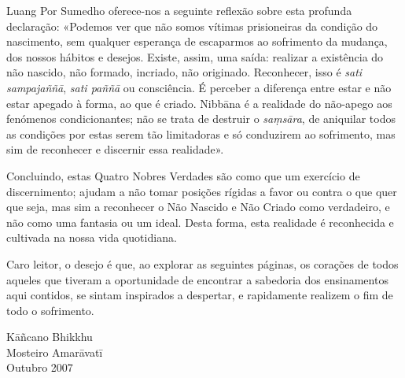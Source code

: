 Luang Por Sumedho oferece-nos a seguinte reflexão sobre esta profunda
declaração: «Podemos ver que não somos vítimas prisioneiras da condição do
nascimento, sem qualquer esperança de escaparmos ao sofrimento da mudança, dos
nossos hábitos e desejos. Existe, assim, uma saída: realizar a existência do não
nascido, não formado, incriado, não originado. Reconhecer, isso é \emph{sati
  sampajaññā}, \emph{sati paññā} ou consciência. É perceber a diferença entre
estar e não estar apegado à forma, ao que é criado. Nibbāna é a realidade do
não-apego aos fenómenos condicionantes; não se trata de destruir o
\emph{saṃsāra}, de aniquilar todos as condições por estas serem tão limitadoras
e só conduzirem ao sofrimento, mas sim de reconhecer e discernir essa realidade».

Concluindo, estas Quatro Nobres Verdades são como que um exercício de
discernimento; ajudam a não tomar posições rígidas a favor ou contra o que quer
que seja, mas sim a reconhecer o Não Nascido e Não Criado como verdadeiro, e não
como uma fantasia ou um ideal. Desta forma, esta realidade é reconhecida e
cultivada na nossa vida quotidiana.

\bigskip

Caro leitor, o desejo é que, ao explorar as seguintes páginas, os corações de todos aqueles que tiveram a oportunidade 
de encontrar a sabedoria dos ensinamentos aqui contidos, se
sintam inspirados a despertar, e rapidamente realizem o fim
de todo o sofrimento.

\bigskip

{\raggedleft
  Kāñcano Bhikkhu\\
  Mosteiro Amarāvatī\\
  Outubro 2007
\par}

